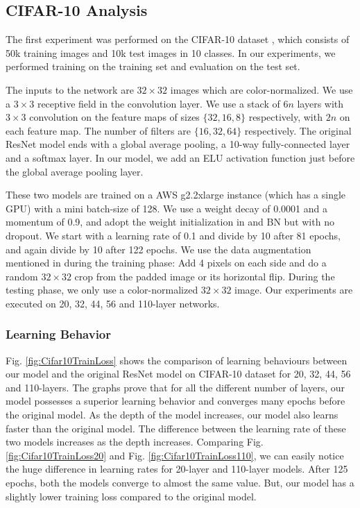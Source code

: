 \documentclass[10pt,twocolumn,letterpaper]{article}
\begin{document}
\subsection{CIFAR-10 Analysis}
\label{cifar10analysis}

The first experiment was performed on the CIFAR-10 dataset \cite{[10]}, which consists of 50k training images and 10k test images in 10 classes. In our experiments, we performed training on the training set and evaluation on the test set.

The inputs to the network are $32 \times 32$ images which are color-normalized. We use a $3 \times 3$ receptive field in the convolution layer. We use a stack of $6n$ layers with $3 \times 3$ convolution on the feature maps of sizes $\{32, 16, 8\}$ respectively, with $2n$ on each feature map. The number of filters are $\{16, 32, 64\}$ respectively. The original ResNet model ends with a global average pooling, a 10-way fully-connected layer and a softmax layer. In our model, we add an ELU activation function just before the global average pooling layer.

These two models are trained on a AWS g2.2xlarge instance (which has a single GPU) with a mini batch-size of 128. We use a weight decay of 0.0001 and a momentum of 0.9, and adopt the weight initialization in \cite{[5]} and BN \cite{[4]} but with no dropout. We start with a learning rate of 0.1 and divide by 10 after 81 epochs, and again divide by 10 after 122 epochs. We use the data augmentation mentioned in \cite{[18]} during the training phase: Add 4 pixels on each side and do a random $32 \times 32$ crop from the padded image or its horizontal flip. During the testing phase, we only use a color-normalized $32 \times 32$ image. Our experiments are executed on 20, 32, 44, 56 and 110-layer networks.

\subsubsection{Learning Behavior}

Fig. \ref{fig:Cifar10TrainLoss} shows the comparison of learning behaviours between our model and the original ResNet model on CIFAR-10 dataset for 20, 32, 44, 56 and 110-layers. The graphs prove that for all the different number of layers, our model possesses a superior learning behavior and converges many epochs before the original model. As the depth of the model increases, our model also learns faster than the original model. The difference between the learning rate of these two models increases as the depth increases. Comparing Fig. \ref{fig:Cifar10TrainLoss20} and Fig. \ref{fig:Cifar10TrainLoss110}, we can easily notice the huge difference in learning rates for 20-layer and 110-layer models. After 125 epochs, both the models converge to almost the same value. But, our model has a slightly lower training loss compared to the original model.
\end{document}
